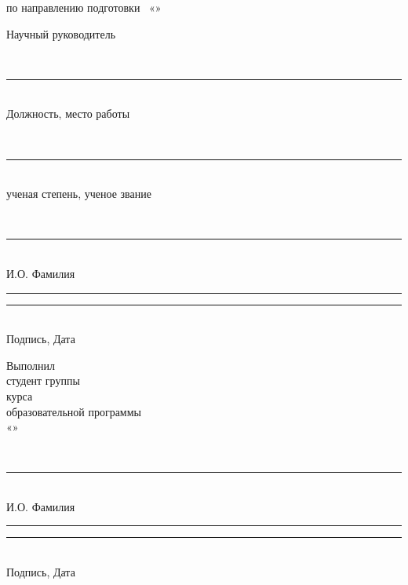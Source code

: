 \begin{titlepage}
\begin{center}
\vspace{0.35cm}
по направлению подготовки \hseProgramCode\ «\hseSpecialization»
\end{center}

\vspace{0.75cm}

\noindent
\begin{minipage}[t]{0.42\textwidth}
\raggedright
Научный руководитель

\vspace{0.18cm}
\strut\hseSupervisorTitle\\[-0.05cm]
\rule{6.1cm}{0.4pt}\\[-0.05cm]
{\scriptsize Должность, место работы}

\vspace{0.08cm}
\strut\hseSupervisorDegree\\[-0.05cm]
\rule{6.1cm}{0.4pt}\\[-0.05cm]
{\scriptsize ученая степень, ученое звание}

\vspace{0.08cm}
\strut\hseSupervisorName\\[-0.05cm]
\rule{6.1cm}{0.4pt}\\[-0.05cm]
{\scriptsize И.О. Фамилия}

\vspace{0.08cm}
\rule{3.6cm}{0.4pt}\quad\rule{2.2cm}{0.4pt}\\[-0.05cm]
{\scriptsize Подпись, Дата}
\end{minipage}
\hfill
\begin{minipage}[t]{0.42\textwidth}
\raggedright
Выполнил\\
студент группы \hseGroup\\
\hseCourse{} курса \hseDegreeLevel\\
образовательной программы\\
«\hseSpecialization»

\vspace{0.25cm}
\strut\hseAuthorName\\[-0.05cm]
\rule{6.1cm}{0.4pt}\\[-0.05cm]
{\scriptsize И.О. Фамилия}

\vspace{0.18cm}
\rule{3.6cm}{0.4pt}\quad\rule{2.2cm}{0.4pt}\\[-0.05cm]
{\scriptsize Подпись, Дата}
\end{minipage}


\end{titlepage}
